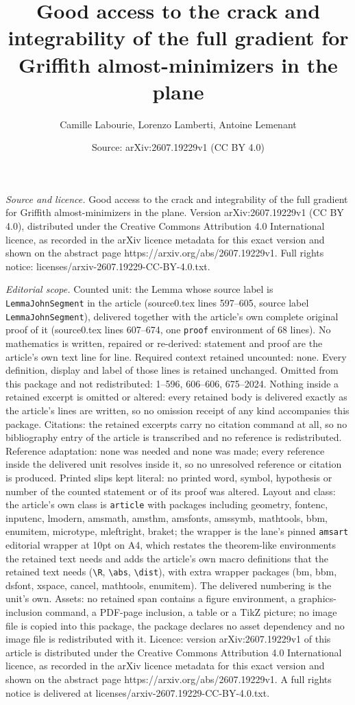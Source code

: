 \documentclass[10pt,a4paper]{amsart}
\title[Good access to the crack and integrability of the full gradi]{Good access to the crack and integrability of the full gradient for Griffith almost-minimizers in the plane}
\author{Camille Labourie, Lorenzo Lamberti, Antoine Lemenant}
\date{Source: arXiv:2607.19229v1 (CC BY 4.0)}
\begin{document}
\maketitle

\noindent\emph{Source and licence.} Good access to the crack and integrability of the full gradient for Griffith almost-minimizers in the plane. Version arXiv:2607.19229v1 (CC BY 4.0), distributed under the Creative Commons Attribution 4.0 International licence, as recorded in the arXiv licence metadata for this exact version and shown on the abstract page https://arxiv.org/abs/2607.19229v1. Full rights notice: licenses/arxiv-2607.19229-CC-BY-4.0.txt.\par\smallskip

\noindent\textit{Editorial scope.} Counted unit: the Lemma whose source label is \texttt{LemmaJohnSegment} in the article (source0.tex lines 597--605, source label \texttt{LemmaJohnSegment}), delivered together with the article's own complete original proof of it (source0.tex lines 607--674, one \texttt{proof} environment of 68 lines). No mathematics is written, repaired or re-derived: statement and proof are the article's own text line for line. Required context retained uncounted: none. Every definition, display and label of those lines is retained unchanged. Omitted from this package and not redistributed: 1--596, 606--606, 675--2024. Nothing inside a retained excerpt is omitted or altered: every retained body is delivered exactly as the article's lines are written, so no omission receipt of any kind accompanies this package. Citations: the retained excerpts carry no citation command at all, so no bibliography entry of the article is transcribed and no reference is redistributed. Reference adaptation: none was needed and none was made; every reference inside the delivered unit resolves inside it, so no unresolved reference or citation is produced. Printed slips kept literal: no printed word, symbol, hypothesis or number of the counted statement or of its proof was altered. Layout and class: the article's own class is \texttt{article} with packages including geometry, fontenc, inputenc, lmodern, amsmath, amsthm, amsfonts, amssymb, mathtools, bbm, enumitem, microtype, mleftright, braket; the wrapper is the lane's pinned \texttt{amsart} editorial wrapper at 10pt on A4, which restates the theorem-like environments the retained text needs and adds the article's own macro definitions that the retained text needs (\texttt{\textbackslash R}, \texttt{\textbackslash abs}, \texttt{\textbackslash dist}), with extra wrapper packages (bm, bbm, dsfont, xspace, cancel, mathtools, enumitem). The delivered numbering is the unit's own. Assets: no retained span contains a figure environment, a graphics-inclusion command, a PDF-page inclusion, a table or a TikZ picture; no image file is copied into this package, the package declares no asset dependency and no image file is redistributed with it. Licence: version arXiv:2607.19229v1 of this article is distributed under the Creative Commons Attribution 4.0 International licence, as recorded in the arXiv licence metadata for this exact version and shown on the abstract page https://arxiv.org/abs/2607.19229v1. A full rights notice is delivered at licenses/arxiv-2607.19229-CC-BY-4.0.txt. 
\end{document}
